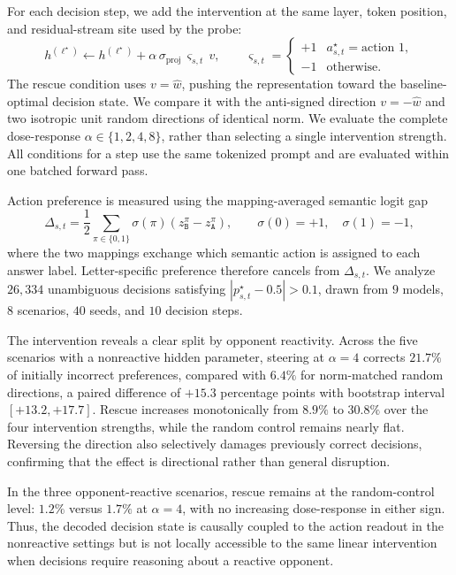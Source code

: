 \documentclass[letterpaper]{article} %
\begin{document}
For each decision step, we add the intervention at the same layer, token position, and residual-stream site used by the probe:
\[
h^{(\ell^\star)}
\leftarrow
h^{(\ell^\star)}
+
\alpha\,\sigma_{\mathrm{proj}}\,
\varsigma_{s,t}\,v,
\qquad
\varsigma_{s,t}
=
\begin{cases}
+1 & a^\star_{s,t}=\text{action }1,\\
-1 & \text{otherwise}.
\end{cases}
\]
The rescue condition uses \(v=\widehat w\), pushing the representation toward the baseline-optimal decision state. We compare it with the anti-signed direction \(v=-\widehat w\) and two isotropic unit random directions of identical norm. We evaluate the complete dose-response \(\alpha\in\{1,2,4,8\}\), rather than selecting a single intervention strength. All conditions for a step use the same tokenized prompt and are evaluated within one batched forward pass.

Action preference is measured using the mapping-averaged semantic logit gap
\[
\Delta_{s,t}
=
\frac{1}{2}
\sum_{\pi\in\{0,1\}}
\sigma(\pi)
\left(
z^\pi_{\texttt{B}}-z^\pi_{\texttt{A}}
\right),
\qquad
\sigma(0)=+1,\quad \sigma(1)=-1,
\]
where the two mappings exchange which semantic action is assigned to each answer label. Letter-specific preference therefore cancels from \(\Delta_{s,t}\). We analyze \(26{,}334\) unambiguous decisions satisfying
\(|p^\star_{s,t}-0.5|>0.1\), drawn from \(9\) models, \(8\) scenarios, \(40\) seeds, and \(10\) decision steps.

The intervention reveals a clear split by opponent reactivity. Across the five scenarios with a nonreactive hidden parameter, steering at \(\alpha=4\) corrects \(21.7\%\) of initially incorrect preferences, compared with \(6.4\%\) for norm-matched random directions, a paired difference of \(+15.3\) percentage points with bootstrap interval \([+13.2,+17.7]\). Rescue increases monotonically from \(8.9\%\) to \(30.8\%\) over the four intervention strengths, while the random control remains nearly flat. Reversing the direction also selectively damages previously correct decisions, confirming that the effect is directional rather than general disruption.

In the three opponent-reactive scenarios, rescue remains at the random-control level: \(1.2\%\) versus \(1.7\%\) at \(\alpha=4\), with no increasing dose-response in either sign. Thus, the decoded decision state is causally coupled to the action readout in the nonreactive settings but is not locally accessible to the same linear intervention when decisions require reasoning about a reactive opponent.
\end{document}
